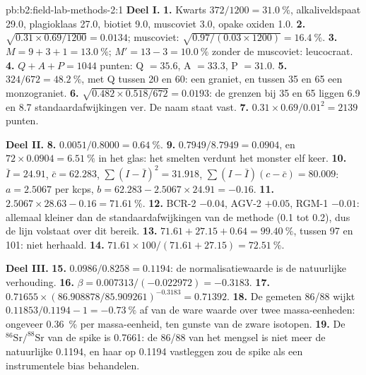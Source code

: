 \begin{solution}{pb:b2:field-lab-methods-2:1}
\noindent\textbf{Deel I.}
\textbf{1.} Kwarts $372/1200 = \qty{31.0}{\percent}$, alkaliveldspaat 29.0, plagioklaas 27.0, biotiet
9.0, muscoviet 3.0, opake oxiden 1.0.
\textbf{2.} $\sqrt{0.31 \times 0.69/1200} = 0.0134$; muscoviet: $\sqrt{0.97/(0.03 \times 1200)} =
\qty{16.4}{\percent}$.
\textbf{3.} $M = 9 + 3 + 1 = \qty{13.0}{\percent}$; $M' = 13 - 3 = \qty{10.0}{\percent}$ zonder de
muscoviet: leucocraat.
\textbf{4.} $Q + A + P = 1044$ punten: Q $= 35.6$, A $= 33.3$, P $= 31.0$.
\textbf{5.} $324/672 = \qty{48.2}{\percent}$, met Q tussen 20 en 60: een graniet, en tussen 35 en
65 een monzograniet.
\textbf{6.} $\sqrt{0.482 \times 0.518/672} = 0.0193$: de grenzen bij 35 en 65 liggen 6.9 en 8.7
standaardafwijkingen ver. De naam staat vast.
\textbf{7.} $0.31 \times 0.69/0.01^2 = 2139$ punten.

\noindent\textbf{Deel II.}
\textbf{8.} $0.0051/0.8000 = \qty{0.64}{\percent}$.
\textbf{9.} $0.7949/8.7949 = 0.0904$, en $72 \times 0.0904 = \qty{6.51}{\percent}$  in het
glas: het smelten verdunt het monster elf keer.
\textbf{10.} $\bar I = 24.91$, $\bar c = 62.283$, $\sum(I - \bar I)^2 = 31.918$, $\sum(I - \bar I)(c -
\bar c) = 80.009$: $a = 2.5067$ per kcps, $b = 62.283 - 2.5067 \times 24.91 = -0.16$.
\textbf{11.} $2.5067 \times 28.63 - 0.16 = \qty{71.61}{\percent}$.
\textbf{12.} BCR-2 $-0.04$, AGV-2 $+0.05$, RGM-1 $-0.01$: allemaal kleiner dan de standaardafwijkingen
van de methode (0.1 tot 0.2), dus de lijn volstaat over dit bereik.
\textbf{13.} $71.61 + 27.15 + 0.64 = \qty{99.40}{\percent}$, tussen 97 en 101: niet herhaald.
\textbf{14.} $71.61 \times 100/(71.61 + 27.15) = \qty{72.51}{\percent}$.

\noindent\textbf{Deel III.}
\textbf{15.} $0.0986/0.8258 = 0.1194$: de normalisatiewaarde is de natuurlijke verhouding.
\textbf{16.} $\beta = 0.007313/(-0.022972) = -0.3183$.
\textbf{17.} $0.71655 \times (86.908878/85.909261)^{-0.3183} = 0.71392$.
\textbf{18.} De gemeten 86/88 wijkt $0.11853/0.1194 - 1 = \qty{-0.73}{\percent}$ af van de ware waarde
over twee massa-eenheden: ongeveer \qty{0.36}{\percent} per massa-eenheid, ten gunste van de zware isotopen.
\textbf{19.} De $^{86}\mathrm{Sr}/^{88}\mathrm{Sr}$ van de spike is 0.7661: de 86/88 van het mengsel is niet
meer de natuurlijke 0.1194, en haar op 0.1194 vastleggen zou de spike als een instrumentele bias behandelen.


\end{solution}
